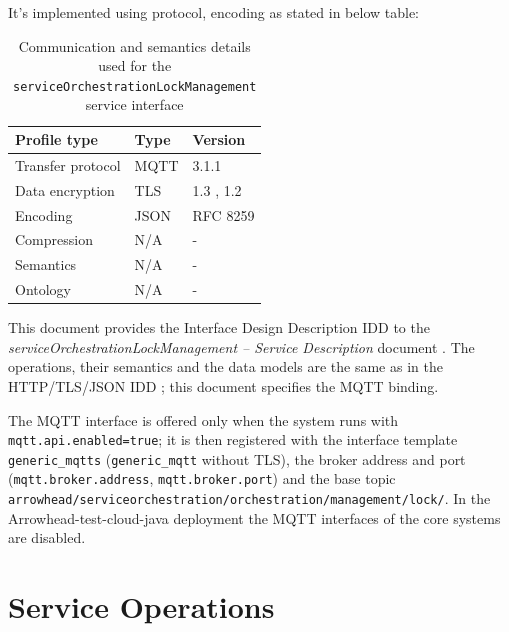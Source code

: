 \documentclass[a4paper]{arrowhead}
\begin{document}
It's implemented using protocol, encoding as stated in below table:
\begin{table}[ht!]
  \centering
  \begin{tabular}{|l|l|l|}
    \hline
    \rowcolor{gray!33} Profile type & Type & Version \\ \hline
    Transfer protocol & MQTT & 3.1.1 \cite{mqtt311} \\ \hline
    Data encryption & TLS & 1.3 \cite{rfc8446}, 1.2 \cite{rfc5246} \\ \hline
    Encoding & JSON & RFC 8259 \cite{rfc8259} \\ \hline
    Compression & N/A & - \\ \hline
    Semantics & N/A & - \\ \hline
    Ontology & N/A & - \\ \hline
  \end{tabular}
  \caption{Communication and semantics details used for the \texttt{service\allowbreak{}Orchestration\allowbreak{}Lock\allowbreak{}Management} service interface}
  \label{tab:comunication_semantics_profile}
\end{table}

This document provides the Interface Design Description IDD to the \textit{serviceOrchestrationLockManagement -- Service Description} document \cite{dso-serviceOrchestrationLockManagement-sd}.
The operations, their semantics and the data models are the same as in the HTTP/TLS/JSON IDD \cite{dso-serviceOrchestrationLockManagement-http-idd}; this document specifies the MQTT binding.

The MQTT interface is offered only when the system runs with \texttt{mqtt.api.enabled=true}; it is then registered with the interface template \texttt{generic\_\allowbreak{}mqtts} (\texttt{generic\_\allowbreak{}mqtt} without TLS), the broker address and port (\texttt{mqtt.\allowbreak{}broker.\allowbreak{}address}, \texttt{mqtt.\allowbreak{}broker.\allowbreak{}port}) and the base topic \texttt{arrowhead/\allowbreak{}serviceorchestration/\allowbreak{}orchestration/\allowbreak{}management/\allowbreak{}lock/\allowbreak{}}. In the Arrowhead-test-cloud-java deployment the MQTT interfaces of the core systems are disabled.

\newpage

\section{Service Operations}
\label{sec:operations}
\end{document}
